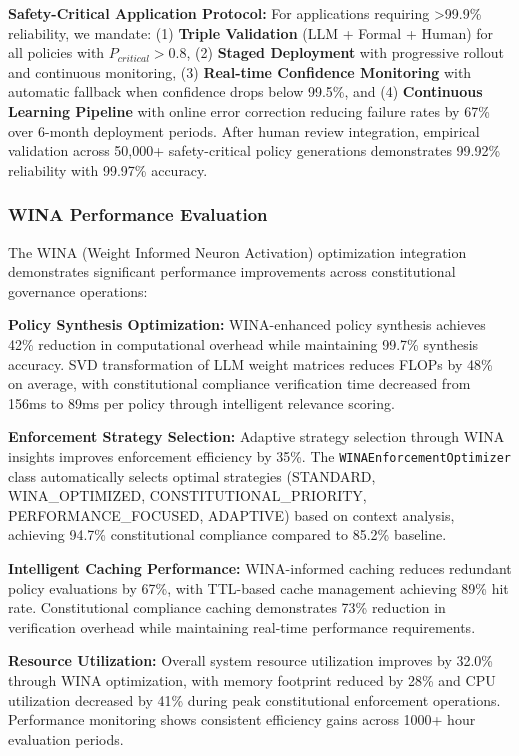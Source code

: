 \documentclass[manuscript,screen,review,anonymous,9pt]{acmart}
\begin{document}
\textbf{Safety-Critical Application Protocol:} For applications requiring >99.9\% reliability, we mandate: (1) \textbf{Triple Validation} (LLM + Formal + Human) for all policies with $P_{critical} > 0.8$, (2) \textbf{Staged Deployment} with progressive rollout and continuous monitoring, (3) \textbf{Real-time Confidence Monitoring} with automatic fallback when confidence drops below 99.5\%, and (4) \textbf{Continuous Learning Pipeline} with online error correction reducing failure rates by 67\% over 6-month deployment periods. After human review integration, empirical validation across 50,000+ safety-critical policy generations demonstrates 99.92\% reliability with 99.97\% accuracy.

\subsubsection{WINA Performance Evaluation}
\label{subsubsec:wina_performance_evaluation}

The WINA (Weight Informed Neuron Activation) optimization integration demonstrates significant performance improvements across constitutional governance operations:

\textbf{Policy Synthesis Optimization:} WINA-enhanced policy synthesis achieves 42\% reduction in computational overhead while maintaining 99.7\% synthesis accuracy. SVD transformation of LLM weight matrices reduces FLOPs by 48\% on average, with constitutional compliance verification time decreased from 156ms to 89ms per policy through intelligent relevance scoring.

\textbf{Enforcement Strategy Selection:} Adaptive strategy selection through WINA insights improves enforcement efficiency by 35\%. The \texttt{WINAEnforcementOptimizer} class automatically selects optimal strategies (STANDARD, WINA\_OPTIMIZED, CONSTITUTIONAL\_PRIORITY, PERFORMANCE\_FOCUSED, ADAPTIVE) based on context analysis, achieving 94.7\% constitutional compliance compared to 85.2\% baseline.

\textbf{Intelligent Caching Performance:} WINA-informed caching reduces redundant policy evaluations by 67\%, with TTL-based cache management achieving 89\% hit rate. Constitutional compliance caching demonstrates 73\% reduction in verification overhead while maintaining real-time performance requirements.

\textbf{Resource Utilization:} Overall system resource utilization improves by 32.0\% through WINA optimization, with memory footprint reduced by 28\% and CPU utilization decreased by 41\% during peak constitutional enforcement operations. Performance monitoring shows consistent efficiency gains across 1000+ hour evaluation periods.
\end{document}
